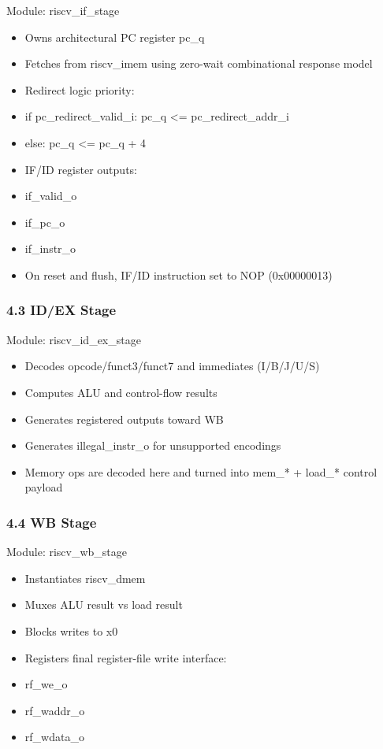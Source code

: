 \documentclass[]{article}
\providecommand{\tightlist}{%
  \setlength{\itemsep}{0pt}\setlength{\parskip}{0pt}}
\begin{document}
Module: riscv\_if\_stage

\begin{itemize}
\tightlist
\item
  Owns architectural PC register pc\_q
\item
  Fetches from riscv\_imem using zero-wait combinational response model
\item
  Redirect logic priority:
\item
  if pc\_redirect\_valid\_i: pc\_q \textless{}= pc\_redirect\_addr\_i
\item
  else: pc\_q \textless{}= pc\_q + 4
\item
  IF/ID register outputs:
\item
  if\_valid\_o
\item
  if\_pc\_o
\item
  if\_instr\_o
\item
  On reset and flush, IF/ID instruction set to NOP (0x00000013)
\end{itemize}

\hypertarget{43-idex-stage}{%
\subsubsection{4.3 ID/EX Stage}\label{43-idex-stage}}

Module: riscv\_id\_ex\_stage

\begin{itemize}
\tightlist
\item
  Decodes opcode/funct3/funct7 and immediates (I/B/J/U/S)
\item
  Computes ALU and control-flow results
\item
  Generates registered outputs toward WB
\item
  Generates illegal\_instr\_o for unsupported encodings
\item
  Memory ops are decoded here and turned into mem\_* + load\_* control
  payload
\end{itemize}

\hypertarget{44-wb-stage}{%
\subsubsection{4.4 WB Stage}\label{44-wb-stage}}

Module: riscv\_wb\_stage

\begin{itemize}
\tightlist
\item
  Instantiates riscv\_dmem
\item
  Muxes ALU result vs load result
\item
  Blocks writes to x0
\item
  Registers final register-file write interface:
\item
  rf\_we\_o
\item
  rf\_waddr\_o
\item
  rf\_wdata\_o
\end{itemize}
\end{document}
